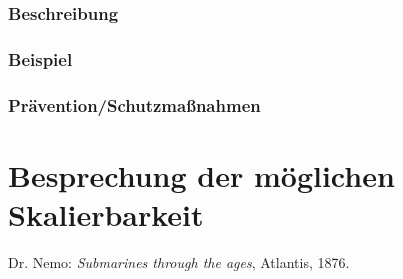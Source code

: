 \documentclass[a4paper,
DIV=13,
12pt,
BCOR=10mm,
department=FakIM,
oneside,
parskip=half,
automark,
listof=totocnumbered,
bibliography=totocnumbered,
acronym=totocnumbered
] {OTHRartcl}
\begin{document}
\subsubsection{Beschreibung}
\subsubsection{Beispiel}
\subsubsection{Prävention/Schutzmaßnahmen}


\section{Besprechung der möglichen Skalierbarkeit}



\begin{appendix}
\listoffigures

\cleardoublepage
\begin{thebibliography}{99}
 Dr. Nemo: \textit{Submarines through the ages}, Atlantis, 1876.

\end{thebibliography}

\cleardoublepage
\makedeclaration
\end{appendix}
\end{document}
